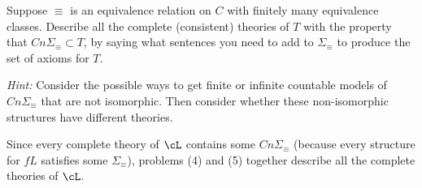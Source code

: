 \begin{problem}
  Suppose $\equiv$ is an equivalence relation on $C$ with finitely many
  equivalence classes. Describe all the complete (consistent) theories
  of $T$ with the property that $Cn \Sigma_\equiv \subset T$, by saying
  what sentences you need to add to $\Sigma_\equiv$ to produce the set
  of axioms for $T$.

  \emph{Hint: } Consider the possible ways to get finite or infinite
  countable models of $Cn \Sigma_\equiv$ that are not isomorphic.
  Then consider whether these non-isomorphic structures have
  different theories.

  Since every complete theory of $\cL$ contains some $Cn \Sigma_\equiv$
  (because every structure for $fL$ satisfies some $\Sigma_\equiv$),
  problems (4) and (5) together describe all the complete theories of $\cL$.

\end{problem}
\begin{Answer}

\end{Answer}
